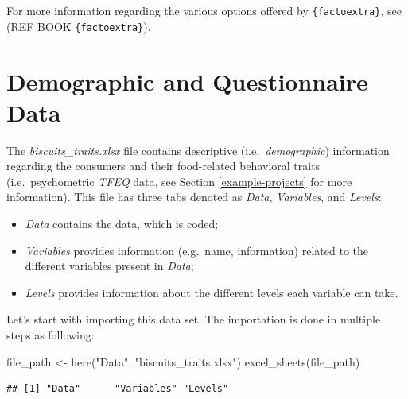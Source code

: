 \documentclass[
]{krantz}
\makeatletter
\newenvironment{Shaded}{\begin{snugshade}}{\end{snugshade}}
\newcommand{\FunctionTok}[1]{\textcolor[rgb]{0,0,0}{#1}}
\newcommand{\NormalTok}[1]{#1}
\newcommand{\OtherTok}[1]{\textcolor[rgb]{0.37,0.37,0.37}{#1}}
\newcommand{\StringTok}[1]{\textcolor[rgb]{0.5,0.5,0.5}{#1}}
\providecommand{\tightlist}{%
  \setlength{\itemsep}{0pt}\setlength{\parskip}{0pt}}
\newenvironment{kframe}{%
\medskip{}
\setlength{\fboxsep}{.8em}
 \def\at@end@of@kframe{}%
 \ifinner\ifhmode%
  \def\at@end@of@kframe{\end{minipage}}%
  \begin{minipage}{\columnwidth}%
 \fi\fi%
 \def\FrameCommand##1{\hskip\@totalleftmargin \hskip-\fboxsep
 \colorbox{shadecolor}{##1}\hskip-\fboxsep
     \hskip-\linewidth \hskip-\@totalleftmargin \hskip\columnwidth}%
 \MakeFramed {\advance\hsize-\width
   \@totalleftmargin\z@ \linewidth\hsize
   \@setminipage}}%
 {\par\unskip\endMakeFramed%
 \at@end@of@kframe}
\renewenvironment{Shaded}{\begin{kframe}}{\end{kframe}}
\makeatother
\begin{document}
For more information regarding the various options offered by \texttt{\{factoextra\}}, see (REF BOOK \texttt{\{factoextra\}}).

\hypertarget{demographic-and-questionnaire-data}{%
\section{Demographic and Questionnaire Data}\label{demographic-and-questionnaire-data}}

The \emph{biscuits\_traits.xlsx} file contains descriptive (i.e.~\emph{demographic}) information regarding the consumers and their food-related behavioral traits (i.e.~psychometric \emph{TFEQ} data, see Section \ref{example-projects} for more information). This file has three tabs denoted as \emph{Data}, \emph{Variables}, and \emph{Levels}:

\begin{itemize}
\tightlist
\item
  \emph{Data} contains the data, which is coded;
\item
  \emph{Variables} provides information (e.g.~name, information) related to the different variables present in \emph{Data};
\item
  \emph{Levels} provides information about the different levels each variable can take.
\end{itemize}

Let's start with importing this data set. The importation is done in multiple steps as following:

\begin{Shaded}
\begin{Highlighting}[]
\NormalTok{file\_path }\OtherTok{\textless{}{-}} \FunctionTok{here}\NormalTok{(}\StringTok{"Data"}\NormalTok{, }\StringTok{"biscuits\_traits.xlsx"}\NormalTok{)}
\FunctionTok{excel\_sheets}\NormalTok{(file\_path)}
\end{Highlighting}
\end{Shaded}

\begin{verbatim}
## [1] "Data"      "Variables" "Levels"
\end{verbatim}
\end{document}
